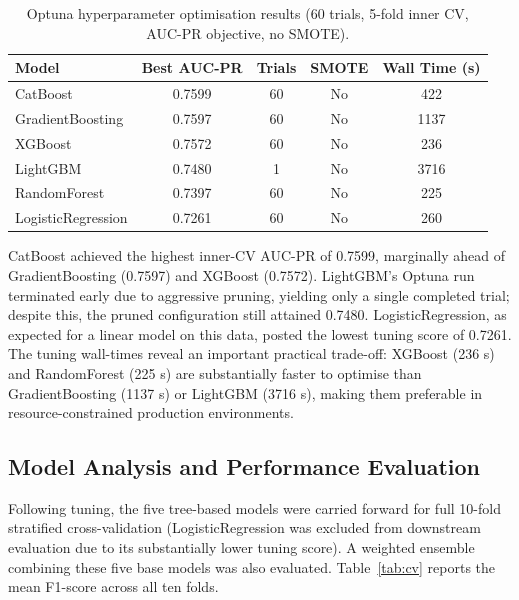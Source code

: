 \begin{table}[H]
\caption{Optuna hyperparameter optimisation results (60 trials, 5-fold
inner CV, AUC-PR objective, no SMOTE).}
\label{tab:optuna}
\centering
\begin{tabular}{lcccc}
\toprule
\textbf{Model} & \textbf{Best AUC-PR} & \textbf{Trials} &
\textbf{SMOTE} & \textbf{Wall Time (s)} \\
\midrule
CatBoost            & 0.7599 & 60 & No & 422  \\
GradientBoosting    & 0.7597 & 60 & No & 1137 \\
XGBoost             & 0.7572 & 60 & No & 236  \\
LightGBM            & 0.7480 &  1 & No & 3716 \\
RandomForest        & 0.7397 & 60 & No & 225  \\
LogisticRegression  & 0.7261 & 60 & No & 260  \\
\bottomrule
\end{tabular}
\end{table}

CatBoost achieved the highest inner-CV AUC-PR of 0.7599, marginally
ahead of GradientBoosting (0.7597) and XGBoost (0.7572). LightGBM's
Optuna run terminated early due to aggressive pruning, yielding only a
single completed trial; despite this, the pruned configuration still
attained 0.7480. LogisticRegression, as expected for a linear model on
this data, posted the lowest tuning score of 0.7261. The tuning
wall-times reveal an important practical trade-off: XGBoost (236 s) and
RandomForest (225 s) are substantially faster to optimise than
GradientBoosting (1137 s) or LightGBM (3716 s), making them preferable
in resource-constrained production environments.

\subsection{Model Analysis and Performance Evaluation}

Following tuning, the five tree-based models were carried forward for
full 10-fold stratified cross-validation (LogisticRegression was excluded
from downstream evaluation due to its substantially lower tuning score).
A weighted ensemble combining these five base models was also evaluated.
Table~\ref{tab:cv} reports the mean F1-score across all ten folds.


